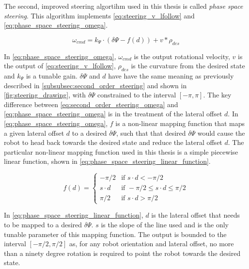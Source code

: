 The second, improved steering algortihm used in this thesis is called \emph{phase space steering}. This algorithm implements \eqref{eq:steering_v_lfollow} and \eqref{eq:phase_space_steering_omega}.

\begin{equation}
\omega_{cmd} = k_\Psi \cdot \left( \delta\Psi - f\left( d \right) \right) + v * \rho_{des}
\label{eq:phase_space_steering_omega}
\end{equation}

In \eqref{eq:phase_space_steering_omega}, $\omega_{cmd}$ is the output rotational velocity, $v$ is the output of \eqref{eq:steering_v_lfollow}, $\rho_{des}$ is the curvature from the desired state and $k_{\Psi}$ is a tunable gain. $\delta\Psi$ and $d$ have have the same meaning as previously described in \autoref{subsubsec:second_order_steering} and shown in \autoref{fig:steering_drawing}, with $\delta\Psi$ constrained to the interval $\left[-\pi,\pi\right]$. The key difference between \eqref{eq:second_order_steering_omega} and \eqref{eq:phase_space_steering_omega} is in the treatment of the lateral offset $d$. In \eqref{eq:phase_space_steering_omega}, $f$ is a non-linear mapping function that maps a given lateral offset $d$ to a desired $\delta\Psi$, such that that desired $\delta\Psi$ would cause the robot to head back towards the desired state and reduce the lateral offset $d$. The particular non-linear mapping function used in this thesis is a simple piecewise linear function, shown in \eqref{eq:phase_space_steering_linear_function}.

\begin{equation}
f\left( d \right) =
	\begin{cases}
		-\pi/2 & \text{if } s \cdot d < -\pi/2 \\
		s \cdot d & \text{if } -\pi/2 \leq s \cdot d \leq \pi/2 \\
		\pi/2 & \text{if } s \cdot d > \pi/2
	\end{cases}
	\label{eq:phase_space_steering_linear_function}
\end{equation}

In \eqref{eq:phase_space_steering_linear_function}, $d$ is the lateral offset that needs to be mapped to a desired $\delta\Psi$. $s$ is the slope of the line used and is the only tunable parameter of this mapping function. The output is bounded to the interval $\left[-\pi/2,\pi/2\right]$ as, for any robot orientation and lateral offset, no more than a ninety degree rotation is required to point the robot towards the desired state.



